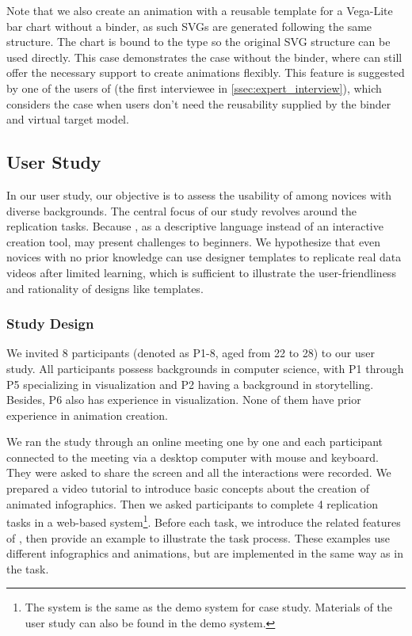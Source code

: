 Note that we also create an animation with a reusable template for a Vega-Lite bar chart without a binder, as such SVGs are generated following the same structure.
The chart is bound to the type  so the original SVG structure can be used directly.
This case demonstrates the case without the binder, where \gaia{} can still offer the necessary support to create animations flexibly.
This feature is suggested by one of the users of \gaia{} (the first interviewee in \autoref{ssec:expert_interview}), which considers the case when users don't need the reusability supplied by the binder and virtual target model.

\subsection{User Study}
In our user study, our objective is to assess the usability of \gaia{} among novices with diverse backgrounds.
The central focus of our study revolves around the replication tasks. 
Because \gaia{}, as a descriptive language instead of an interactive creation tool, may present challenges to beginners. 
We hypothesize that even novices with no prior knowledge can use designer templates to replicate real data videos after limited learning, which is sufficient to illustrate the user-friendliness and rationality of designs like templates.

\subsubsection{Study Design}
We invited 8 participants (denoted as P1-8, aged from 22 to 28) to our user study.
All participants possess backgrounds in computer science, with P1 through P5 specializing in visualization and P2 having a background in storytelling. 
Besides, P6 also has experience in visualization.
None of them have prior experience in animation creation.

We ran the study through an online meeting one by one and each participant connected to the meeting via a desktop computer with mouse and keyboard.
They were asked to share the screen and all the interactions were recorded.
We prepared a video tutorial to introduce basic concepts about the creation of animated infographics.
Then we asked participants to complete 4 replication tasks in a web-based system\footnote{The system is the same as the demo system for case study. Materials of the user study can also be found in the demo system.}.
Before each task, we introduce the related features of \gaia{}, then provide an example to illustrate the task process.
These examples use different infographics and animations, but are implemented in the same way as in the task.

